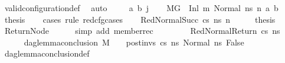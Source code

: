\begin{isabellebody}
\ valid{\isacharunderscore}{\kern0pt}configuration{\isacharunderscore}{\kern0pt}def\ \isamarkupfalse%
\ auto\isanewline
{}\isamarkupfalse%
\isanewline
\ \ \isamarkupfalse%
\ {\isacharparenleft}{\kern0pt}{}\ a\ b\ j{\isacharprime}{\kern0pt}{\isacharparenright}{\kern0pt}\isanewline
\ \ \isamarkupfalse%
\ {\isacartoucheopen}M{\isacharcomma}{\kern0pt}{\isasymLambda}{\isacharcomma}{\kern0pt}{\isasymGamma}{\isacharcomma}{\kern0pt}{\isasymOmega}{\isacharcomma}{\kern0pt}G{}\ {\isasymturnstile}\ {\isacharparenleft}{\kern0pt}Inl\ m{}{\isacharcomma}{\kern0pt}\ Normal\ ns{}{\isacharparenright}{\kern0pt}\ {\isacharminus}{\kern0pt}n{\isasymrightarrow}\ {\isacharparenleft}{\kern0pt}a{\isacharcomma}{\kern0pt}\ b{\isacharparenright}{\kern0pt}{\isacartoucheclose}\ \isamarkupfalse%
\ {\isacharquery}{\kern0pt}thesis\isanewline
\ \ \isamarkupfalse%
\ {\isacharparenleft}{\kern0pt}cases\ rule{\isacharcolon}{\kern0pt}\ red{\isacharunderscore}{\kern0pt}cfg{\isachardot}{\kern0pt}cases{\isacharparenright}{\kern0pt}\isanewline
\ \ \isamarkupfalse%
\ {\isacharparenleft}{\kern0pt}RedNormalSucc\ cs\ ns{\isacharprime}{\kern0pt}\ n{\isacharprime}{\kern0pt}{\isacharparenright}{\kern0pt}\isanewline
\ \ \isamarkupfalse%
\ \isamarkupfalse%
\ {\isacharquery}{\kern0pt}thesis\ \isamarkupfalse%
\ ReturnNode\isanewline
\ \ \ \ \isamarkupfalse%
\ {\isacharparenleft}{\kern0pt}simp\ add{\isacharcolon}{\kern0pt}\ member{\isacharunderscore}{\kern0pt}rec{\isacharparenleft}{\kern0pt}{}{\isacharparenright}{\kern0pt}{\isacharparenright}{\kern0pt}\isanewline
\ \ \isamarkupfalse%
\isanewline
\ \ \ \ \isamarkupfalse%
\ {\isacharparenleft}{\kern0pt}RedNormalReturn\ cs\ ns{}{\isacharprime}{\kern0pt}{\isacharparenright}{\kern0pt}\isanewline
\ \ \ \ \isamarkupfalse%
\ {\isachardoublequoteopen}dag{\isacharunderscore}{\kern0pt}lemma{\isacharunderscore}{\kern0pt}conclusion\ M\ {\isasymLambda}\ {\isasymGamma}\ {\isasymOmega}\ post{\isacharunderscore}{\kern0pt}invs\ cs{}\ ns{}\ {\isacharparenleft}{\kern0pt}Normal\ ns{}{\isacharprime}{\kern0pt}{\isacharparenright}{\kern0pt}\ False{\isachardoublequoteclose}\isanewline
\ \ \ \ \ \ \isamarkupfalse%
\ dag{\isacharunderscore}{\kern0pt}lemma{\isacharunderscore}{\kern0pt}conclusion{\isacharunderscore}{\kern0pt}def\isanewline

\end{isabellebody}
